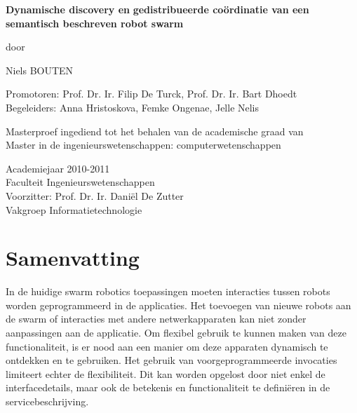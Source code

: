
\newpage

{
\setlength{\baselineskip}{32pt}
\setlength{\parindent}{0pt}
\setlength{\parskip}{18pt}

\begin{center}

\noindent \textbf{\huge
Dynamische discovery en }
\textbf{\huge gedistribueerde co\"{o}rdinatie van een}
\textbf{\huge semantisch beschreven robot swarm}

\setlength{\baselineskip}{12pt}
\setlength{\parindent}{0pt}
\setlength{\parskip}{12pt}

door 

Niels BOUTEN

Promotoren: Prof. Dr. Ir. Filip De Turck, Prof. Dr. Ir. Bart Dhoedt\\
Begeleiders: Anna Hristoskova, Femke Ongenae, Jelle Nelis

Masterproef ingediend tot het behalen van de academische graad van\\
Master in de ingenieurswetenschappen: computerwetenschappen

Academiejaar 2010-2011\\
Faculteit Ingenieurswetenschappen\\
Voorzitter: Prof. Dr. Ir. Dani\"{e}l De Zutter\\
Vakgroep Informatietechnologie\\

\end{center}

\setlength{\baselineskip}{10pt}
\setlength{\parindent}{0pt}
\setlength{\parskip}{10pt}

\renewcommand{\baselinestretch}{1.1} 	%
\small\normalsize                       %

\section*{Samenvatting}

In de huidige swarm robotics toepassingen moeten interacties tussen robots worden geprogrammeerd in de applicaties. Het toevoegen van nieuwe robots aan de swarm of interacties met andere netwerkapparaten kan niet zonder aanpassingen aan de applicatie. Om flexibel gebruik te kunnen maken van deze functionaliteit, is er nood aan een manier om deze apparaten dynamisch te ontdekken en te gebruiken. Het gebruik van voorgeprogrammeerde invocaties limiteert echter de flexibiliteit. Dit kan worden opgelost door niet enkel de interfacedetails, maar ook de betekenis en functionaliteit te defini\"{e}ren in de servicebeschrijving.


}

